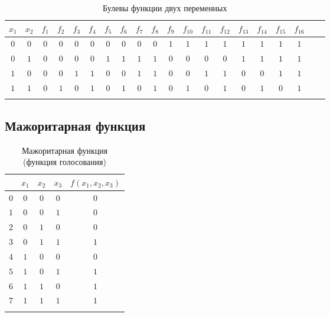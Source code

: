 \documentclass[a5paper, 11pt]{extarticle}
\theoremstyle{definition}
\theoremstyle{definition}
\theoremstyle{definition}
\numberwithin{figure}{section}
\numberwithin{table}{section}
\begin{document}
{
    \setlength{\tabcolsep}{3pt}
    \renewcommand*{\arraystretch}{1.5}
    \begin{longtable}{|c|c!{\vrule width 1.2pt}Sc|c|c|c|c|c|c|c|c|c|c|c|c|c|c|c|c|}
        \hline
        \(x_1\) & \(x_2\) & \(f_1\) & \(f_2\) & \(f_3\) & \(f_4\) & \(f_5\) & \(f_6\) & \(f_7\) & \(f_8\) & \(f_9\) & \(f_{10}\) & \(f_{11}\) & \(f_{12}\) & \(f_{13}\) & \(f_{14}\) & \(f_{15}\) & \(f_{16}\) \\
        \hline
        \(0\)   & \(0\)   & \(0\)   & \(0\)   & \(0\)   & \(0\)   & \(0\)   & \(0\)   & \(0\)   & \(0\)   & \(1\)   & \(1\)      & \(1\)      & \(1\)      & \(1\)      & \(1\)      & \(1\)      & \(1\)      \\
        \hline
        \(0\)   & \(1\)   & \(0\)   & \(0\)   & \(0\)   & \(0\)   & \(1\)   & \(1\)   & \(1\)   & \(1\)   & \(0\)   & \(0\)      & \(0\)      & \(0\)      & \(1\)      & \(1\)      & \(1\)      & \(1\)      \\
        \hline
        \(1\)   & \(0\)   & \(0\)   & \(0\)   & \(1\)   & \(1\)   & \(0\)   & \(0\)   & \(1\)   & \(1\)   & \(0\)   & \(0\)      & \(1\)      & \(1\)      & \(0\)      & \(0\)      & \(1\)      & \(1\)      \\
        \hline
        \(1\)   & \(1\)   & \(0\)   & \(1\)   & \(0\)   & \(1\)   & \(0\)   & \(1\)   & \(0\)   & \(1\)   & \(0\)   & \(1\)      & \(0\)      & \(1\)      & \(0\)      & \(1\)      & \(0\)      & \(1\)      \\
        \hline
        \caption{Булевы функции двух переменных}
    \end{longtable}
}

\subsection{Мажоритарная функция}

{
    \renewcommand*{\arraystretch}{1.5}
    \begin{longtable}{|c|c|c|c|c|}
        \hline
              & \(x_1\) & \(x_2\) & \(x_3\) & \(f(x_1, x_2, x_3)\) \\
        \hline
        \(0\) & \(0\)   & \(0\)   & \(0\)   & \(0\)                \\
        \hline
        \(1\) & \(0\)   & \(0\)   & \(1\)   & \(0\)                \\
        \hline
        \(2\) & \(0\)   & \(1\)   & \(0\)   & \(0\)                \\
        \hline
        \(3\) & \(0\)   & \(1\)   & \(1\)   & \(1\)                \\
        \hline
        \(4\) & \(1\)   & \(0\)   & \(0\)   & \(0\)                \\
        \hline
        \(5\) & \(1\)   & \(0\)   & \(1\)   & \(1\)                \\
        \hline
        \(6\) & \(1\)   & \(1\)   & \(0\)   & \(1\)                \\
        \hline
        \(7\) & \(1\)   & \(1\)   & \(1\)   & \(1\)                \\
        \hline
        \caption{Мажоритарная функция (функция голосования)}
    \end{longtable}
}
\end{document}
